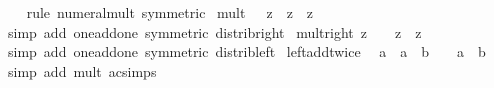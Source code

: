 \begin{isabellebody}
%
\isadelimproof
\ \ %
\endisadelimproof
%
\isatagproof
{}\isamarkupfalse%
\ {\isacharparenleft}{\kern0pt}rule\ numeral{\isacharunderscore}{\kern0pt}mult\ {\isacharbrackleft}{\kern0pt}symmetric{\isacharbrackright}{\kern0pt}{\isacharparenright}{\kern0pt}%
\endisatagproof
{\isafoldproof}%
%
\isadelimproof
\isanewline
%
\endisadelimproof
\isanewline
{}\isamarkupfalse%
\ mult{\isacharunderscore}{\kern0pt}{}{\isacharcolon}{\kern0pt}\ {\isachardoublequoteopen}{}\ {\isacharasterisk}{\kern0pt}\ z\ {\isacharequal}{\kern0pt}\ z\ {\isacharplus}{\kern0pt}\ z{\isachardoublequoteclose}\isanewline
%
\isadelimproof
\ \ %
\endisadelimproof
%
\isatagproof
{}\isamarkupfalse%
\ {\isacharparenleft}{\kern0pt}simp\ add{\isacharcolon}{\kern0pt}\ one{\isacharunderscore}{\kern0pt}add{\isacharunderscore}{\kern0pt}one\ {\isacharbrackleft}{\kern0pt}symmetric{\isacharbrackright}{\kern0pt}\ distrib{\isacharunderscore}{\kern0pt}right{\isacharparenright}{\kern0pt}%
\endisatagproof
{\isafoldproof}%
%
\isadelimproof
\isanewline
%
\endisadelimproof
\isanewline
{}\isamarkupfalse%
\ mult{\isacharunderscore}{\kern0pt}{}{\isacharunderscore}{\kern0pt}right{\isacharcolon}{\kern0pt}\ {\isachardoublequoteopen}z\ {\isacharasterisk}{\kern0pt}\ {}\ {\isacharequal}{\kern0pt}\ z\ {\isacharplus}{\kern0pt}\ z{\isachardoublequoteclose}\isanewline
%
\isadelimproof
\ \ %
\endisadelimproof
%
\isatagproof
{}\isamarkupfalse%
\ {\isacharparenleft}{\kern0pt}simp\ add{\isacharcolon}{\kern0pt}\ one{\isacharunderscore}{\kern0pt}add{\isacharunderscore}{\kern0pt}one\ {\isacharbrackleft}{\kern0pt}symmetric{\isacharbrackright}{\kern0pt}\ distrib{\isacharunderscore}{\kern0pt}left{\isacharparenright}{\kern0pt}%
\endisatagproof
{\isafoldproof}%
%
\isadelimproof
\isanewline
%
\endisadelimproof
\isanewline
{}\isamarkupfalse%
\ left{\isacharunderscore}{\kern0pt}add{\isacharunderscore}{\kern0pt}twice{\isacharcolon}{\kern0pt}\isanewline
\ \ {\isachardoublequoteopen}a\ {\isacharplus}{\kern0pt}\ {\isacharparenleft}{\kern0pt}a\ {\isacharplus}{\kern0pt}\ b{\isacharparenright}{\kern0pt}\ {\isacharequal}{\kern0pt}\ {}\ {\isacharasterisk}{\kern0pt}\ a\ {\isacharplus}{\kern0pt}\ b{\isachardoublequoteclose}\isanewline
%
\isadelimproof
\ \ %
\endisadelimproof
%
\isatagproof
{}\isamarkupfalse%
\ {\isacharparenleft}{\kern0pt}simp\ add{\isacharcolon}{\kern0pt}\ mult{\isacharunderscore}{\kern0pt}{}\ ac{\isacharunderscore}{\kern0pt}simps{\isacharparenright}{\kern0pt}%
\endisatagproof

\end{isabellebody}
